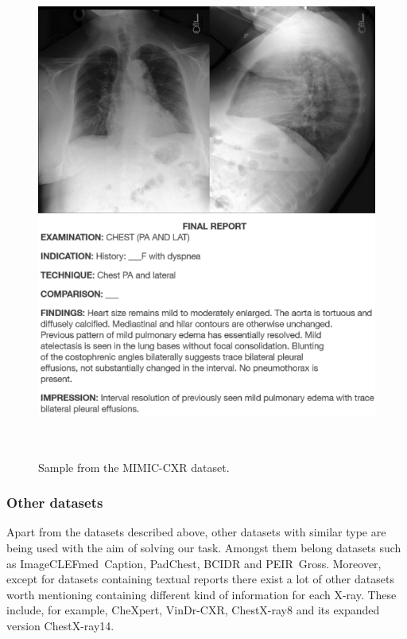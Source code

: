 \begin{figure}[h]\centering
\includegraphics[width=135mm, height=163mm]{../img/mimic_s57861150}
\caption{Sample from the MIMIC-CXR dataset.}
\label{fig04:MimicCXRSample}
\end{figure}

\subsubsection{Other datasets}
Apart from the datasets described above, other datasets with similar type are being used with the aim of solving our task. Amongst them belong datasets such as ImageCLEFmed~Caption\citep{ImageCLEFmedicalCaptionOverview2022}, PadChest\citep{bustos2020padchest}, BCIDR\citep{zhang2017mdnet} and PEIR~Gross\citep{jing2017automatic}. Moreover, except for datasets containing textual reports there exist a lot of other datasets worth mentioning containing different kind of information for each X-ray. These include, for example, CheXpert\citep{irvin2019chexpert}, VinDr-CXR\citep{nguyen2020vindr}, ChestX-ray8\citep{wang2017chestx} and its expanded version ChestX-ray14.

